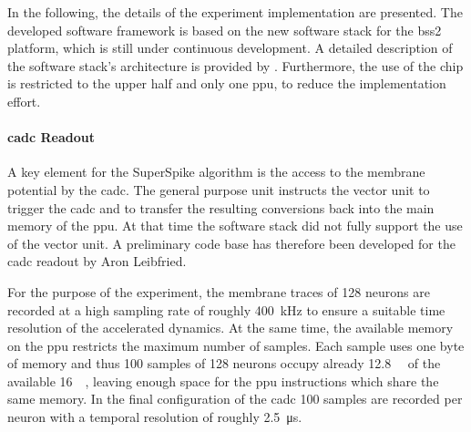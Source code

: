 In the following, the details of the experiment implementation are presented. The developed software framework is based on the new software stack for the \gls{bss2} platform, which is still under continuous development. A detailed description of the software stack's architecture is provided by \cite{mueller2020bss2ll}. Furthermore, the use of the chip is restricted to the upper half and only one \gls{ppu}, to reduce the implementation effort.

\paragraph{\gls{cadc} Readout}
A key element for the SuperSpike algorithm is the access to the membrane potential by the \gls{cadc}. The general purpose unit instructs the vector unit to trigger the \gls{cadc} and to transfer the resulting conversions back into the main memory of the \gls{ppu}. At that time the software stack did not fully support the use of the vector unit. A preliminary code base has therefore been developed for the \gls{cadc} readout by Aron Leibfried. 

For the purpose of the experiment, the membrane traces of 128 neurons are recorded at a high sampling rate of roughly \SI{400}{\kilo \Hz} to ensure a suitable time resolution of the accelerated dynamics. At the same time, the available memory on the \gls{ppu} restricts the maximum number of samples. Each sample uses one byte of memory and thus 100 samples of 128 neurons occupy already \SI{12.8}{\kilo \byte} of the available \SI{16}{\kilo \byte}, leaving enough space for the \gls{ppu} instructions which share the same memory. In the final configuration of the \gls{cadc} 100 samples are recorded per neuron with a temporal resolution of roughly \SI{2.5}{\micro \s}.

